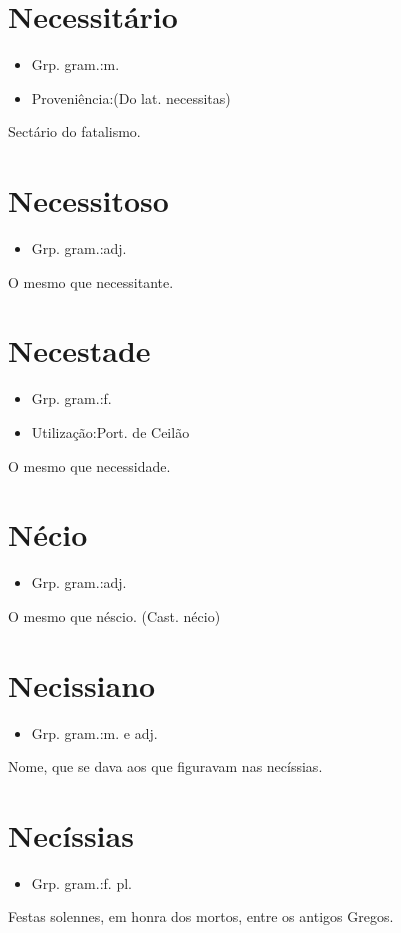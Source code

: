 \section{Necessitário}
\begin{itemize}
\item {Grp. gram.:m.}
\end{itemize}
\begin{itemize}
\item {Proveniência:(Do lat. \textunderscore necessitas\textunderscore )}
\end{itemize}
Sectário do fatalismo.
\section{Necessitoso}
\begin{itemize}
\item {Grp. gram.:adj.}
\end{itemize}
O mesmo que \textunderscore necessitante\textunderscore .
\section{Necestade}
\begin{itemize}
\item {Grp. gram.:f.}
\end{itemize}
\begin{itemize}
\item {Utilização:Port. de Ceilão}
\end{itemize}
O mesmo que \textunderscore necessidade\textunderscore .
\section{Nécio}
\begin{itemize}
\item {Grp. gram.:adj.}
\end{itemize}
O mesmo que \textunderscore néscio\textunderscore .
(Cast. \textunderscore nécio\textunderscore )
\section{Necissiano}
\begin{itemize}
\item {Grp. gram.:m.  e  adj.}
\end{itemize}
Nome, que se dava aos que figuravam nas necíssias.
\section{Necíssias}
\begin{itemize}
\item {Grp. gram.:f. pl.}
\end{itemize}
Festas solennes, em honra dos mortos, entre os antigos Gregos.
